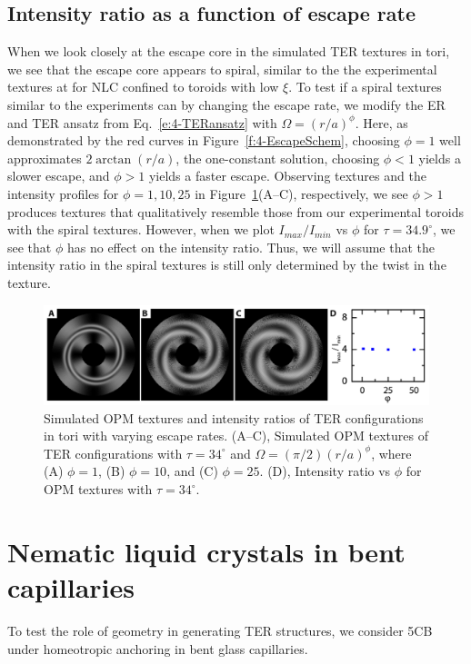 \subsection{Intensity ratio as a function of escape rate}
When we look closely at the escape core in the simulated TER textures in tori, we see that the escape core appears to spiral, similar to the the experimental textures at for NLC confined to toroids with low $\xi$.
To test if a spiral textures similar to the experiments can by changing the escape rate, we modify the ER and TER ansatz from Eq.~\ref{e:4-TERansatz} with $\Omega = (r/a)^{\phi}$.
Here, as demonstrated by the red curves in Figure~\ref{f:4-EscapeSchem}, choosing $\phi = 1$ well approximates $2 \arctan(r/a)$, the one-constant solution, choosing $\phi < 1$ yields a slower escape, and $\phi > 1$ yields a faster escape.
Observing textures and the intensity profiles for $\phi = 1,10,25$ in Figure~\ref{f:4-I0I45vsEscape}(A--C), respectively, we see $\phi > 1$ produces textures that qualitatively resemble those from our experimental toroids with the spiral textures.
However, when we plot $I_{max}/I_{min}$ vs $\phi$ for $\tau = 34.9^{\circ}$, we see that $\phi$ has no effect on the intensity ratio.
Thus, we will assume that the intensity ratio in the spiral textures is still only determined by the twist in the texture.
\begin{figure}
  \centering
  \includegraphics{figures/C4/Ch4-Figs_I0I45vsEscape.png}
  \caption{Simulated OPM textures and intensity ratios of TER configurations in tori with varying escape rates.
  (A--C), Simulated OPM textures of TER configurations with $\tau = 34^\circ$ and $\Omega = (\pi/2)(r/a)^{\phi}$, where (A) $\phi = 1$, (B) $\phi = 10$, and (C) $\phi = 25$.
  (D), Intensity ratio vs $\phi$ for OPM textures with $\tau = 34^\circ$.}\label{f:4-I0I45vsEscape}
\end{figure}

\section{Nematic liquid crystals in bent capillaries}
To test the role of geometry in generating TER structures, we consider 5CB under homeotropic anchoring in bent glass capillaries.

